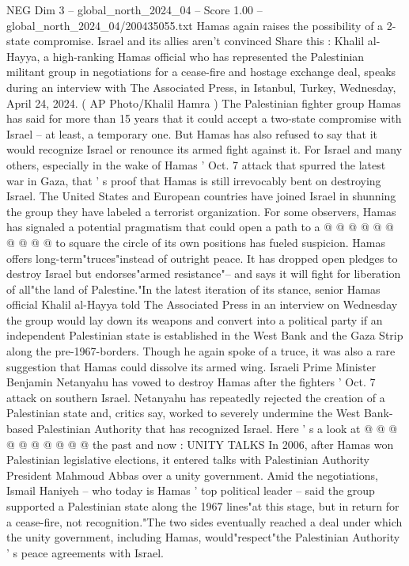 \begin{textsample}{NEG Dim 3 – global\_north\_2024\_04 – Score 1.00 – global\_north\_2024\_04/200435055.txt}  \label{ex:f3_neg_407}
Hamas again raises the possibility of a 2-state compromise.
Israel and its allies aren't convinced Share this : Khalil al-Hayya, a high-ranking Hamas official who has represented the Palestinian militant group in negotiations for a cease-fire and hostage exchange deal, speaks during an interview with The Associated Press, in Istanbul, Turkey, Wednesday, April 24, 2024. ( AP Photo/Khalil Hamra ) The Palestinian fighter group Hamas has said for more than 15 years that it could accept a two-state compromise with Israel -- at least, a temporary one.
But Hamas has also refused to say that it would recognize Israel or renounce its armed fight against it.
For Israel and many others, especially in the wake of Hamas ' Oct. 7 attack that spurred the latest war in Gaza, that ' s proof that Hamas is still irrevocably bent on destroying Israel.
The United States and European countries have joined Israel in shunning the group they have labeled a terrorist organization.
For some observers, Hamas has signaled a potential pragmatism that could open a path to a @ @ @ @ @ @ @ @ @ @ to square the circle of its own positions has fueled suspicion.
Hamas offers long-term"truces"instead of outright peace.
It has dropped open pledges to destroy Israel but endorses"armed resistance"-- and says it will fight for liberation of all"the land of Palestine."In the latest iteration of its stance, senior Hamas official Khalil al-Hayya told The Associated Press in an interview on Wednesday the group would lay down its weapons and convert into a political party if an independent Palestinian state is established in the West Bank and the Gaza Strip along the pre-1967-borders.
Though he again spoke of a truce, it was also a rare suggestion that Hamas could dissolve its armed wing.
Israeli Prime Minister Benjamin Netanyahu has vowed to destroy Hamas after the fighters ' Oct. 7 attack on southern Israel.
Netanyahu has repeatedly rejected the creation of a Palestinian state and, critics say, worked to severely undermine the West Bank-based Palestinian Authority that has recognized Israel.
Here ' s a look at @ @ @ @ @ @ @ @ @ @ the past and now : UNITY TALKS In 2006, after Hamas won Palestinian legislative elections, it entered talks with Palestinian Authority President Mahmoud Abbas over a unity government.
Amid the negotiations, Ismail Haniyeh -- who today is Hamas ' top political leader -- said the group supported a Palestinian state along the 1967 lines"at this stage, but in return for a cease-fire, not recognition."The two sides eventually reached a deal under which the unity government, including Hamas, would"respect"the Palestinian Authority ' s peace agreements with Israel.

\end{textsample}
